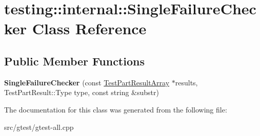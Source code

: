\hypertarget{classtesting_1_1internal_1_1_single_failure_checker}{}\section{testing\+:\+:internal\+:\+:Single\+Failure\+Checker Class Reference}
\label{classtesting_1_1internal_1_1_single_failure_checker}
\subsection*{Public Member Functions}
\begin{DoxyCompactItemize}
\item 
\mbox{\label{classtesting_1_1internal_1_1_single_failure_checker_a6d350d385526c97c9982e928f5f8fb56}} 
{\bfseries Single\+Failure\+Checker} (const \mbox{\hyperlink{classtesting_1_1_test_part_result_array}{Test\+Part\+Result\+Array}} $\ast$results, Test\+Part\+Result\+::\+Type type, const string \&substr)
\end{DoxyCompactItemize}


The documentation for this class was generated from the following file\+:\begin{DoxyCompactItemize}
\item 
src/gtest/gtest-\/all.\+cpp\end{DoxyCompactItemize}
